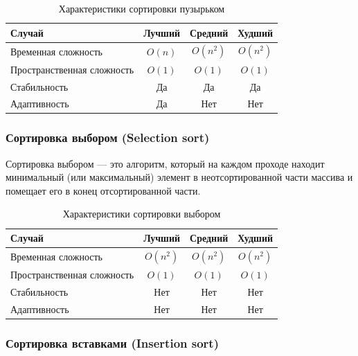 \documentclass[a4paper,12pt]{article}
\begin{document}
\begin{table}[H]
    \centering
    \begin{tabular}{|l|c|c|c|}
        \hline
        Случай & Лучший & Средний & Худший \\
        \hline
        Временная сложность & $O(n)$ & $O(n^2)$ & $O(n^2)$ \\
        \hline
        Пространственная сложность & $O(1)$ & $O(1)$ & $O(1)$ \\
        \hline
        Стабильность & Да & Да & Да \\
        \hline
        Адаптивность & Да & Нет & Нет \\
        \hline
    \end{tabular}
    \caption{Характеристики сортировки пузырьком}
\end{table}

\subsubsection{Сортировка выбором (Selection sort)}
\label{subsubsec:сортировка-выбором-selection-sort}

Сортировка выбором --- это алгоритм, который на каждом проходе находит минимальный (или максимальный) элемент в неотсортированной части массива и помещает его в конец отсортированной части.

\begin{table}[H]
    \centering
    \begin{tabular}{|l|c|c|c|}
        \hline
        Случай & Лучший & Средний & Худший \\
        \hline
        Временная сложность & $O(n^2)$ & $O(n^2)$ & $O(n^2)$ \\
        \hline
        Пространственная сложность & $O(1)$ & $O(1)$ & $O(1)$ \\
        \hline
        Стабильность & Нет & Нет & Нет \\
        \hline
        Адаптивность & Нет & Нет & Нет \\
        \hline
    \end{tabular}
    \caption{Характеристики сортировки выбором}
\end{table}

\subsubsection{Сортировка вставками (Insertion sort)}
\label{subsubsec:сортировка-вставками-insertion-sort}
\end{document}
